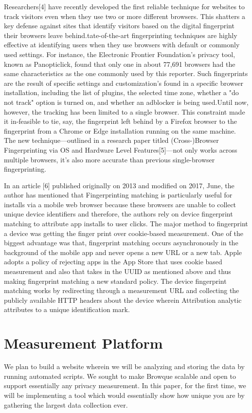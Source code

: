 \documentclass[journal]{IEEEtran}
\begin{document}
Researchers[4] have recently developed the first reliable technique for websites
to track visitors even when they use two or more different browsers. This
shatters a key defense against sites that identify visitors based on the digital
fingerprint their browsers leave behind.tate-of-the-art fingerprinting
techniques are highly effective at identifying users when they use browsers with
default or commonly used settings. For instance, the Electronic Frontier
Foundation's privacy tool, known as Panopticlick, found that only one in about
77,691 browsers had the same characteristics as the one commonly used by this
reporter. Such fingerprints are the result of specific settings and
customization's found in a specific browser installation, including the list of
plugins, the selected time zone, whether a "do not track" option is turned on,
and whether an adblocker is being used.Until now, however, the tracking has been
limited to a single browser. This constraint made it in-feasible to tie, say, the
fingerprint left behind by a Firefox browser to the fingerprint from a Chrome or
Edge installation running on the same machine. The new technique—outlined in a
research paper titled (Cross-)Browser Fingerprinting via OS and Hardware Level
Features[5]—not only works across multiple browsers, it's also more accurate
than previous single-browser fingerprinting.

In an article [6] published originally on 2013 and modified on 2017, June, the author has
mentioned that Fingerprinting matching is particularly useful for installs via a mobile
web browser because these browsers are unable to collect unique device identifiers and
therefore, the authors rely on device fingerprint matching to attribute app installs to
user clicks. The major method to fingerprint a device was getting the finger print over
cookie-based measurement. One of the biggest advantage was that, fingerprint matching
occurs asynchronously in the background of the mobile app and never opens a new URL or a
new tab. Apple adopts a policy of rejecting apps in the App Store that uses cookie based
measurement and also that takes in the UUID as mentioned above and thus making
fingerprint matching a new standard policy. The device fingerprint matching works by
redirecting through a measurement URL and collecting the publicly available HTTP headers
about the device wherein Attribution analytic attributes to a unique identification
mark. 

\section{Measurement Platform}
We plan to build a website wherein we will be analyzing and storing the data by running
automated scripts. We sought to make Browque scalable and open to support essentially any
privacy measurement. In this paper, for the first time, we will be implementing a tool
which would essentially show how unique you are by gathering the largest data collection
ever. 
\end{document}
